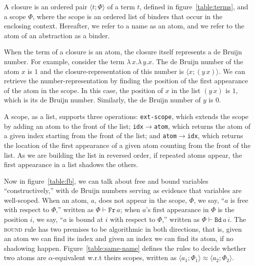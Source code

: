 \documentclass[a4paper,UKenglish]{lipics-v2016}
\newcommand{\clos}[2] {
  \langle #1; #2 \rangle
}
\newcommand{\aeq}[4] {
  \clos{#1}{#2} \approx \clos{#3}{#4}
}
\newcommand*{\transname}[1]{\textsc{#1}}
\begin{document}


\begin{definition}
  A closure is an ordered pair $\clos{t}{\Phi}$ of a term $t$, defined
  in figure~\ref{table:terms}, and a scope $\Phi$, where the scope is
  an ordered list of binders that occur in the enclosing context.
  Hereafter, we refer to a name as an atom, and we refer to the atom
  of an abstraction as a binder.
\end{definition}

When the term of a closure is an atom, the closure itself represents a
de Bruijn number.  For example, consider the term
$\lambda\,x.\lambda\,y.x$. The de Bruijn number of the atom $x$ is $1$
and the closure-representation of this number is $\clos{x}{(y\,x)}$.
We can retrieve the number-representation by finding the position of
the first appearance of the atom in the scope. In this case, the
position of $x$ in the list $(y\,x)$ is $1$, which is its de Bruijn
number. Similarly, the de Bruijn number of $y$ is $0$.

A scope, as a list, supports three operations: \texttt{ext-scope},
which extends the scope by adding an atom to the front of the list;
\texttt{idx$\rightarrow$atom}, which returns the atom of a given index
starting from the front of the list; and
\texttt{atom$\rightarrow$idx}, which returns the location of the first
appearance of a given atom counting from the front of the list.  As we
are building the list in reversed order, if repeated atoms appear, the
first appearance in a list shadows the others.

Now in figure~\ref{table:fb}, we can talk about free and bound
variables ``constructively,'' with de Bruijn numbers serving as
evidence that variables are well-scoped.  When an atom, $a$, does not
appear in the scope, $\Phi$, we say, ``$a$ is free with respect to
$\Phi$,'' written as $\Phi \vdash \texttt{Fr}\, a$; when $a$'s first
appearance in $\Phi$ is the position $i$, we say, ``$a$ is bound at
$i$ with respect to $\Phi$,'' written as $\Phi \vdash \texttt{Bd}\,
a\,i$.  The \transname{bound} rule has two premises to be algorithmic
in both directions, that is, given an atom we can find its index and
given an index we can find its atom, if no shadowing happen.
Figure~\ref{table:same-name} defines the rules to decide whether two
atoms are $\alpha$-equivalent w.r.t theirs scopes, written as
$\aeq{a_1}{\Phi_1}{a_2}{\Phi_2}$.
\end{document}
